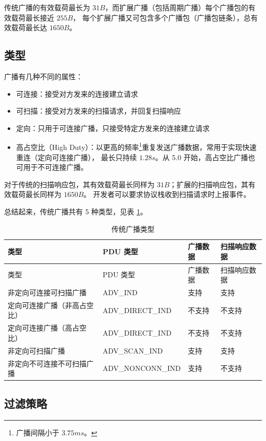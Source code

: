 \documentclass[
  12pt,
]{book}
\begin{document}
传统广播的有效载荷最长为 \(31B\)，而扩展广播（包括周期广播）每个广播包的有效载荷最长接近 \(255B\)，
每个扩展广播又可包含多个广播包（广播包链条），总有效载荷最长达 \(1650B\)。

\hypertarget{ux7c7bux578b}{%
\subsection{类型}\label{ux7c7bux578b}}

广播有几种不同的属性：

\begin{itemize}
\item
  可连接：接受对方发来的连接建立请求
\item
  可扫描：接受对方发来的扫描请求，并回复扫描响应
\item
  定向：只用于可连接广播，只接受特定方发来的连接建立请求
\item
  高占空比（High Duty）：以更高的频率\footnote{广播间隔小于 \(3.75ms\)。}重复发送广播数据，常用于实现快速重连（定向可连接广播），
  最长只持续 \(1.28s\)。从 5.0 开始，高占空比广播也可用于不可连接广播。
\end{itemize}

对于传统的扫描响应包，其有效载荷最长同样为 \(31B\)；扩展的扫描响应包，其有效载荷最长同样为 \(1650B\)。
开发者可以要求协议栈收到扫描请求时上报事件。

总结起来，传统广播共有 5 种类型，见表 \ref{tab:ch1-legacy-adv-types}。

\begin{longtable}[]{@{}llll@{}}
\caption{\label{tab:ch1-legacy-adv-types} 传统广播类型}\tabularnewline
\toprule()
类型 & PDU 类型 & 广播数据 & 扫描响应数据 \\
\midrule()
\endfirsthead
\toprule()
类型 & PDU 类型 & 广播数据 & 扫描响应数据 \\
\midrule()
\endhead
非定向可连接可扫描广播 & ADV\_IND & 支持 & 支持 \\
定向可连接广播（非高占空比） & ADV\_DIRECT\_IND & 不支持 & 不支持 \\
定向可连接广播（高占空比） & ADV\_DIRECT\_IND & 不支持 & 不支持 \\
非定向可扫描广播 & ADV\_SCAN\_IND & 支持 & 支持 \\
非定向不可连接不可扫描广播 & ADV\_NONCONN\_IND & 支持 & 不支持 \\
\bottomrule()
\end{longtable}

\hypertarget{ch1-adv-filter}{%
\subsection{过滤策略}\label{ch1-adv-filter}}
\end{document}
